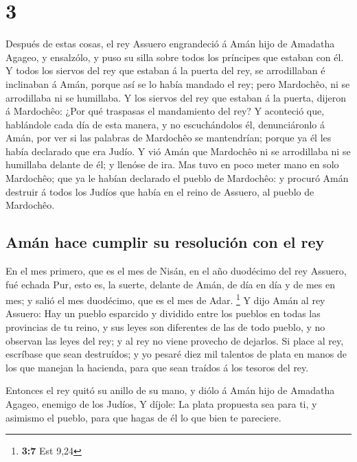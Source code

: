 \hypertarget{section-2}{%
\section{3}\label{section-2}}

 Después de estas cosas, el rey Assuero engrandeció á Amán
hijo de Amadatha Agageo, y ensalzólo, y puso su silla sobre todos los
príncipes que estaban con él.  Y todos los siervos del rey
que estaban á la puerta del rey, se arrodillaban é inclinaban á Amán,
porque así se lo había mandado el rey; pero Mardochêo, ni se arrodillaba
ni se humillaba.  Y los siervos del rey que estaban á la
puerta, dijeron á Mardochêo: ¿Por qué traspasas el mandamiento del rey?
 Y aconteció que, hablándole cada día de esta manera, y no
escuchándolos él, denunciáronlo á Amán, por ver si las palabras de
Mardochêo se mantendrían; porque ya él les había declarado que era
Judío.  Y vió Amán que Mardochêo ni se arrodillaba ni se
humillaba delante de él; y llenóse de ira.  Mas tuvo en
poco meter mano en solo Mardochêo; que ya le habían declarado el pueblo
de Mardochêo: y procuró Amán destruir á todos los Judíos que había en el
reino de Assuero, al pueblo de Mardochêo.

\hypertarget{amuxe1n-hace-cumplir-su-resoluciuxf3n-con-el-rey}{%
\subsection{Amán hace cumplir su resolución con el
rey}\label{amuxe1n-hace-cumplir-su-resoluciuxf3n-con-el-rey}}

 En el mes primero, que es el mes de Nisán, en el año
duodécimo del rey Assuero, fué echada Pur, esto es, la suerte, delante
de Amán, de día en día y de mes en mes; y salió el mes duodécimo, que es
el mes de Adar. \footnote{\textbf{3:7} Est 9,24}  Y dijo
Amán al rey Assuero: Hay un pueblo esparcido y dividido entre los
pueblos en todas las provincias de tu reino, y sus leyes son diferentes
de las de todo pueblo, y no observan las leyes del rey; y al rey no
viene provecho de dejarlos.  Si place al rey, escríbase
que sean destruídos; y yo pesaré diez mil talentos de plata en manos de
los que manejan la hacienda, para que sean traídos á los tesoros del
rey.

 Entonces el rey quitó su anillo de su mano, y diólo á
Amán hijo de Amadatha Agageo, enemigo de los Judíos,  Y
díjole: La plata propuesta sea para ti, y asimismo el pueblo, para que
hagas de él lo que bien te pareciere.

